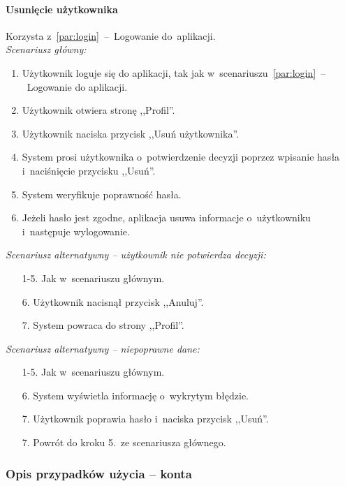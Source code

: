 \paragraph{Usunięcie użytkownika\newline}
\label{par:deleteUser}
Korzysta z~\ref{par:login}~--~Logowanie do~aplikacji.\\

\noindent \textit{Scenariusz główny:}
\begin{enumerate}
  \item Użytkownik loguje się do aplikacji, tak jak w~scenariuszu~\ref{par:login}~--~Logowanie do aplikacji.
  \item Użytkownik otwiera stronę ,,Profil''.
  \item Użytkownik naciska przycisk ,,Usuń użytkownika''.
  \item System prosi użytkownika o~potwierdzenie decyzji poprzez wpisanie hasła i~naciśnięcie przycisku ,,Usuń''.
  \item System weryfikuje poprawność hasła.
  \item Jeżeli hasło jest zgodne, aplikacja usuwa informacje o~użytkowniku i~następuje wylogowanie.
\end{enumerate}

\noindent \textit{Scenariusz alternatywny -- użytkownik nie potwierdza decyzji:}
\begin{enumerate}
  \item[1-5.] Jak w~scenariuszu głównym.
  \item[6.] Użytkownik nacisnął przycisk ,,Anuluj''.
  \item[7.] System powraca do strony ,,Profil''.
\end{enumerate}

\noindent \textit{Scenariusz alternatywny -- niepoprawne dane:}
\begin{enumerate}
  \item[1-5.] Jak w~scenariuszu głównym.
  \item[6.] System wyświetla informację o~wykrytym błędzie.
  \item[7.] Użytkownik poprawia hasło i~naciska przycisk ,,Usuń''.
  \item[7.] Powrót do kroku 5.~ze scenariusza głównego.
\end{enumerate}

\subsubsection{Opis przypadków użycia -- konta}


